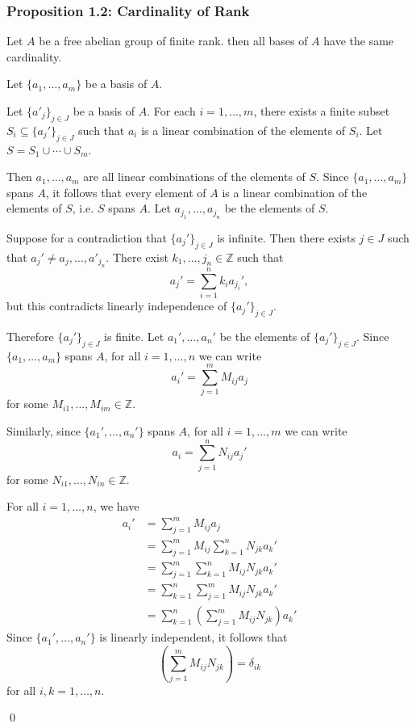 \documentclass{article}
\renewenvironment{proof}{{\bfseries\color{blue1} Proof:}}{\qed}
\begin{document}
\subsubsection{Proposition 1.2: Cardinality of Rank}
\begin{idea}
    Let $A$ be a free abelian group of finite rank. then all bases of $A$ have the same cardinality.
\end{idea}
\begin{proof}
    Let $\{a_1,\dots,a_m\}$ be a basis of $A$.
    
    Let $\{a'_j\}_{j\in J}$ be a basis of $A$. For each $i=1,\dots,m$, there exists a finite subset $S_i \subseteq \{a_j'\}_{j\in J}$ such that $a_i$ is a linear combination of the elements of $S_i$. Let $S=S_1 \cup \cdots \cup S_m$.

    Then $a_1,\dots,a_m$ are all linear combinations of the elements of $S$. Since $\{a_1,\dots,a_m\}$ spans $A$, it follows that every element of $A$ is a linear combination of the elements of $S$, i.e. $S$ spans $A$. Let $a_{j_1},\dots,a_{j_n}$ be the elements of $S$.

    Suppose for a contradiction that $\{a_j'\}_{j\in J}$ is infinite. Then there exists $j\in J$ such that $a_j' \neq a_j,\dots, a'_{j_n}$. There exist $k_1,\dots,j_n\in \mathbb{Z}$ such that
    \begin{equation}
        a_j' = \sum_{i=1}^{n}k_ia_{j_i}',
    \end{equation}
    but this contradicts linearly independence of $\{a_j'\}_{j\in J}$.

    Therefore $\{a_j'\}_{j\in J}$ is finite. Let $a_1',\dots,a_n'$ be the elements of $\{a_j'\}_{j\in J}$. Since $\{a_1,\dots,a_m\}$ spans $A$, for all $i=1,\dots,n$ we can write 
    \begin{equation}
        a_i' = \sum_{j=1}^m M_{ij}a_j
    \end{equation}
    for some $M_{i1},\dots,M_{im}\in \mathbb{Z}$.

    Similarly, since $\{a_1',\dots,a_n'\}$ spans $A$, for all $i=1,\dots,m$ we can write
    \begin{equation}
        a_i = \sum_{j=1}^n N_{ij}a_j'
    \end{equation}
    for some $N_{i1},\dots,N_{in}\in \mathbb{Z}$.

    For all $i=1,\dots,n$, we have
    \begin{align*}
        a_i' &= \sum_{j=1}^m M_{ij}a_j \\ 
        &= \sum_{j=1}^m M_{ij} \sum_{k=1}^n N_{jk}a_k' \\ 
        &= \sum_{j=1}^m\sum_{k=1}^n M_{ij}N_{jk}a_k' \\ 
        &= \sum_{k=1}^n \sum_{j=1}^m M_{ij}N_{jk}a_k' \\ 
        &= \sum_{k=1}^n\left( \sum_{j=1}^m M_{ij}N_{jk}\right)a_k'
    \end{align*}
    Since $\{a_1',\dots,a_n'\}$ is linearly independent, it follows that 
    \begin{equation}
        \left( \sum_{j=1}^m M_{ij}N_{jk}\right) = \delta_{ik}
    \end{equation}
    for all $i,k=1,\dots,n$.


\end{proof}
\end{document}
